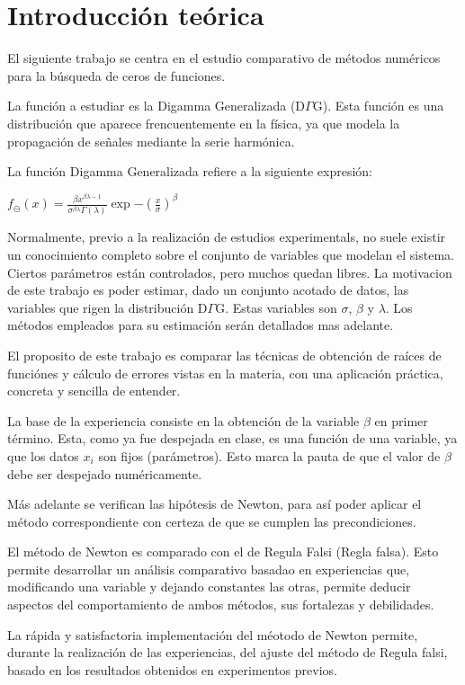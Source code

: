 \section{Introducci\'on te\'orica}

El siguiente trabajo se centra en el estudio comparativo de m\'etodos
num\'ericos para la b\'usqueda de ceros de funciones. 

La funci\'on a estudiar es la Digamma Generalizada (D$\Gamma$G). 
Esta funci\'on es una distribuci\'on que aparece frencuentemente en la f\'isica,
ya que modela la propagaci\'on de se\~nales mediante la serie harm\'onica.

La funci\'on Digamma Generalizada refiere a la siguiente expresi\'on:

\begin{math}
f_{\ominus}(x) = \frac{\beta x^{\beta \lambda -1}}{\sigma ^{\beta \lambda}
\Gamma(\lambda)}\exp {-(\frac{x}{\sigma})^{\beta}}
\end{math}

Normalmente, previo a la realizaci\'on de estudios experimentals, no suele
existir un conocimiento completo sobre el conjunto de variables que modelan
el sistema. Ciertos par\'ametros est\'an controlados, pero muchos quedan libres. 
La motivacion de este trabajo es poder estimar, dado un conjunto acotado de datos, 
las variables que rigen la distribuci\'on D$\Gamma$G. 
Estas variables son $\sigma$, $\beta$ y $\lambda$. Los m\'etodos empleados para 
su estimaci\'on ser\'an detallados mas adelante.

El proposito de este trabajo es comparar las t\'ecnicas de obtenci\'on de ra\'ices 
de funci\'ones y c\'alculo de errores vistas en la materia, 
con una aplicaci\'on pr\'actica, concreta y sencilla de entender.

La base de la experiencia consiste en la obtenci\'on de la variable $\beta$ en
primer t\'ermino. Esta, como ya fue despejada en clase, es una funci\'on
de una variable, ya que los datos $x_i$ son fijos (par\'ametros). 
Esto marca la pauta de que el valor de $\beta$ debe ser despejado
num\'ericamente. 

M\'as adelante se verifican las hip\'otesis de Newton, para as\'i poder aplicar
el m\'etodo correspondiente con certeza de que se cumplen las precondiciones.

El m\'etodo de Newton es comparado con el de Regula Falsi (Regla falsa). Esto
permite desarrollar un an\'alisis comparativo basadao en experiencias que,
modificando una variable y dejando constantes las otras, permite deducir
aspectos del comportamiento de ambos m\'etodos, sus fortalezas y debilidades.

La r\'apida y satisfactoria implementaci\'on del m\'eotodo de Newton permite,
durante la realizaci\'on de las experiencias, del ajuste del m\'etodo de Regula
falsi, basado en los resultados obtenidos en experimentos previos.
